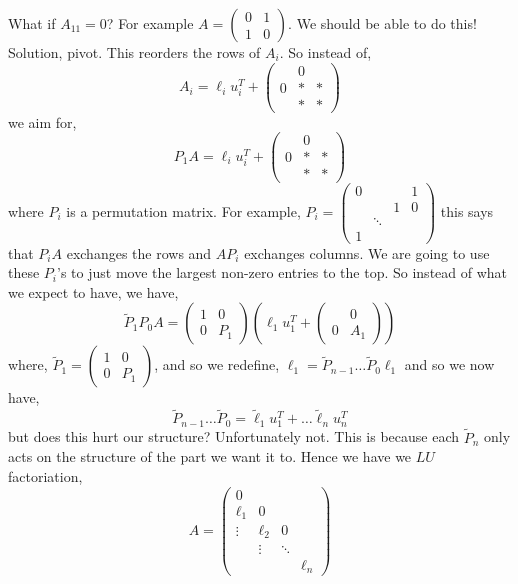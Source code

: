 
What if $A_{11} = 0$? For example $A = \begin{pmatrix}
  0 & 1 \\ 1 & 0
\end{pmatrix}$.  We should be able to do this! Solution, pivot. This reorders the rows of $A_i$. So instead of,
$$ A_i = \ell_i u_i^T + \begin{pmatrix}
  & 0 & \\
  0 &*&* \\
  &*&*
\end{pmatrix} $$
we aim for,
$$ P_1A = \ell_i u_i^T + \begin{pmatrix}
  & 0 & \\
  0 &*&* \\
  &*&*
\end{pmatrix} $$
where $P_i$ is a permutation matrix.  For example, $P_i = \begin{pmatrix}
  0 &&& 1 \\
  &&1& 0 \\
  & \ddots && \\ %
  1 &&&
\end{pmatrix}$
this says that $P_iA$ exchanges the rows and $AP_i$ exchanges columns. We are going to use these $P_i$'s to just move the largest non-zero entries to the top. So instead of what we expect to have, we have,
$$ \tilde P_1 P_0 A = \begin{pmatrix}
  1 & 0 \\
  0 & P_1
\end{pmatrix} \left(\ell_1 u_1^T + \begin{pmatrix}
   & 0 \\
   0 & A_1
\end{pmatrix}\right) $$
where, $\tilde P_1 =  \begin{pmatrix}
  1 & 0 \\
  0 & P_1
\end{pmatrix}$, and so we redefine, $\ell_1 = \tilde P_{n-1} \dots \tilde P_0 \ell_1$ and so we now have,
$$ \tilde P_{n-1} \dots \tilde P_0 = \tilde \ell_1 u_1^T + \dots \tilde \ell_n u_n^T  $$
but does this hurt our structure? Unfortunately not. This is because each $\tilde P_n$ only acts on the structure of the part we want it to. Hence we have we $LU$ factoriation,
$$ A = \begin{pmatrix}
  0&&& \\
  \ell_1 & 0 && \\
  \vdots&\ell_2 &0& \\
  &\vdots& \ddots & \\
  &&& \ell_n
\end{pmatrix} $$

